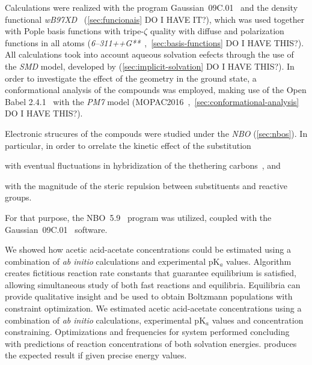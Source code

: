 Calculations were realized with the program Gaussian~09C.01~\cite{g09}
and the density functional
\emph{wB97XD}~\cite{Chai_2008a,Chai_2008b} (\cref{sec:funcionais} DO I HAVE IT?),
which was used together with Pople basis functions with tripe-$\zeta$ quality
with diffuse and polarization functions in all atoms
(\emph{6--311++G**}~\cite{Ditchfield_1971,Hehre_1972,Hariharan_1973,Hariharan_1974,Gordon_1980,Francl_1982,Clark_1983,Frisch_1984,Binning_1990,Blaudeau_1997,Rassolov_1998,Rassolov_2001},~\cref{sec:basis-functions} DO I HAVE THIS?).
All calculations took into account aqueous solvation eefects through the use of the \emph{SMD} model,
developed by \citeauthor{Marenich_2009} (\cref{sec:implicit-solvation} DO I HAVE THIS?).
In order to investigate the effect of the geometry in the ground state,
a conformational analysis of the compounds was employed,
making use of the Open Babel 2.4.1~\cite{O_Boyle_2011}
with the \emph{PM7} model (MOPAC2016~\cite{MOPAC},~\cref{sec:conformational-analysis} DO I HAVE THIS?).

Electronic strucures of the compouds were studied under the \emph{NBO} (\cref{sec:nbos}).
In particular,
in order to orrelate the kinetic effect of the substitution
\begin{enumerate*}[label=(\roman*)]
	\item with eventual fluctuations in hybridization of the thethering carbons~\cite{Bent_1961},
	      and
	\item with the magnitude of the steric repulsion between substituents and reactive groups.
\end{enumerate*}

For that purpose,
the NBO~5.9~\cite{NBO5.9} program was utilized,
coupled with the Gaussian~09C.01~\cite{g09} software.

We showed how
acetic acid-acetate concentrations could be estimated using a combination of \emph{ab initio} calculations and experimental pK$_a$ values.
Algorithm creates fictitious reaction rate constants that guarantee equilibrium is satisfied,
allowing simultaneous study of both fast reactions and equilibria.
Equilibria can provide qualitative insight and be used to obtain Boltzmann populations with constraint optimization.
We estimated acetic acid-acetate concentrations using a combination of \emph{ab initio} calculations,
experimental pK$_a$ values and  concentration constraining.
Optimizations and frequencies for  system performed concluding with predictions of reaction concentrations of both solvation energies.
\overreact{} produces the expected result if given precise energy values.


